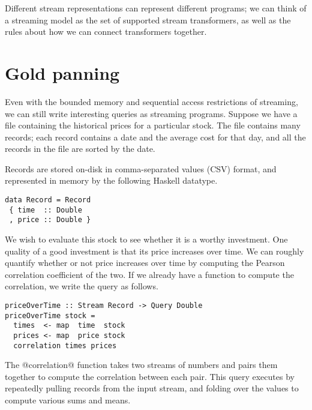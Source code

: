  Different stream representations can represent different programs; we can think of a streaming model as the set of supported stream transformers, as well as the rules about how we can connect transformers together.


\section{Gold panning}
Even with the bounded memory and sequential access restrictions of streaming, we can still write interesting queries as streaming programs.
Suppose we have a file containing the historical prices for a particular stock.
The file contains many records; each record contains a date and the average cost for that day, and all the records in the file are sorted by the date.

Records are stored on-disk in comma-separated values (CSV) format, and represented in memory by the following Haskell datatype.

\begin{lstlisting}
data Record = Record
 { time  :: Double
 , price :: Double }
\end{lstlisting}

We wish to evaluate this stock to see whether it is a worthy investment.
One quality of a good investment is that its price increases over time.
We can roughly quantify whether or not price increases over time by computing the Pearson correlation coefficient of the two.
If we already have a function to compute the correlation, we write the query as follows.

\begin{lstlisting}
priceOverTime :: Stream Record -> Query Double
priceOverTime stock =
  times  <- map  time  stock
  prices <- map  price stock
  correlation times prices
\end{lstlisting}

The @correlation@ function takes two streams of numbers and pairs them together to compute the correlation between each pair.
This query executes by repeatedly pulling records from the input stream, and folding over the values to compute various sums and means.

